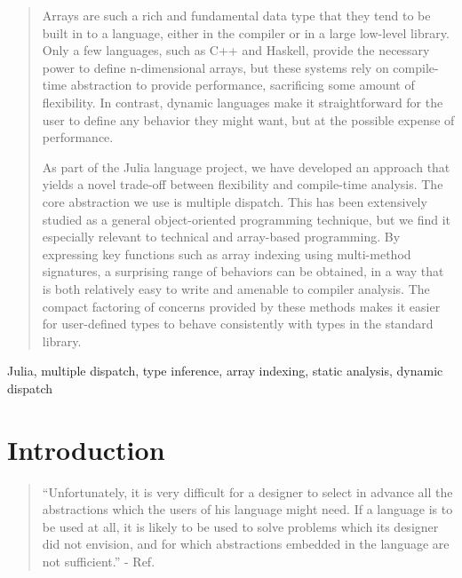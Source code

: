 \documentclass[preprint]{sigplanconf}
\begin{document}
\begin{abstract}

Arrays are such a rich and fundamental data type that they tend to be built in to
a language, either in the compiler or in a large low-level library.
Only a few languages, such as C++ and Haskell, provide the necessary power to define
n-dimensional arrays, but these systems rely on compile-time abstraction to provide
performance, sacrificing some amount of flexibility.
In contrast, dynamic languages make it straightforward for the user to define any
behavior they might want, but at the possible expense of performance.

As part of the Julia language project, we have developed an approach that yields
a novel trade-off between flexibility and compile-time analysis. The core
abstraction we use is multiple dispatch. This has been extensively studied
as a general object-oriented programming technique, but we find it
especially relevant to technical and array-based programming. By expressing
key functions such as array indexing using multi-method
signatures, a surprising range of behaviors can be obtained, in a way that is
both relatively easy to write and amenable to compiler analysis.
The compact factoring of concerns provided by these methods makes it easier
for user-defined types to behave consistently with types in the standard
library.




\end{abstract}


\keywords
Julia, multiple dispatch, type inference, array indexing, static analysis,
dynamic dispatch

\section{Introduction}

\begin{quotation}
``Unfortunately, it is very difficult for a designer to select in advance all
the abstractions which the users of his language might need. If a language is
to be used at all, it is likely to be used to solve problems which its
designer did not envision, and for which abstractions embedded in the language
are not sufficient.'' - Ref. \cite{Liskov:1974pb}
\end{quotation}
\end{document}

